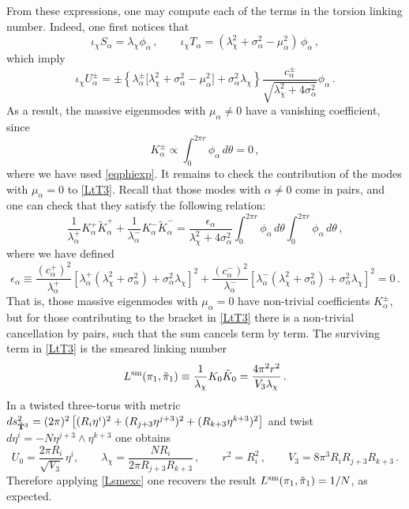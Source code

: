 \documentclass[11pt]{article}
\def\a {\alpha}
\def\be{\begin{equation}}
\def\ee{\end{equation}}
\def\th {{\theta}}
\begin{document}
From these expressions, one may compute each of the terms in the torsion linking number. Indeed, one first notices that
\begin{equation}
	\iota_\chi S_\a =   \lambda_\chi \phi_\a \,, \qquad \iota_\chi T_\a = ( \lambda_\chi^2 + \sigma_\a^2 -  \mu_\a^2) \, \phi_\a \,,
\end{equation}
which imply
\begin{equation}
	\iota_\chi U^\pm_\a = \pm \left\{\lambda^\pm_\a\bigg[ \lambda_\chi^2+\sigma_\a^2-\mu_\a^2\bigg]+\sigma_\a^2  \lambda_\chi\right\}\frac{c_\a^{\pm} }{\sqrt{ \lambda_\chi^2 + 4 \sigma_\a^2}} \phi_\a\,.
\end{equation}
As a result, the  massive eigenmodes with $\mu_\a \neq 0$ have a vanishing coefficient, since
\begin{equation}
	K^\pm_\a \propto \int_0^{2 \pi r}  \phi_\a \, d \th = 0  \,,
\end{equation}
where we have used \eqref{eqphiexp}. It remains to check the contribution of the modes with $\mu_\a = 0$ to \eqref{LtT3}. Recall that those modes with $\alpha\neq 0$ come in pairs, and one can check that they satisfy the following relation:
\begin{equation}
	\frac{1}{\lambda_\a^+} K^+_\a \tilde{K}^+_\a + \frac{1}{\lambda_\a^-} K^-_\a \tilde{K}^-_\a = \frac{\epsilon_\a}{ \lambda_\chi^2 + 4\sigma_\a^2} \int_0^{2 \pi r}  \phi_\a \, d\th \int_0^{2 \pi r}  \phi_\a \, d\th \,,
\end{equation}
where we have defined
\begin{equation}\label{eqdelta}
	\epsilon_\a \equiv \frac{(c_\a^{+})^2}{\lambda_\a^+} \left[\lambda_\a^+( \lambda_\chi^2+\sigma_\a^2) + \sigma_\a^2  \lambda_\chi\right]^2 + \frac{(c_\a^{-})^2}{\lambda^-_\a} \left[\lambda_\a^-( \lambda_\chi^2+\sigma_\a^2) + \sigma_\a^2  \lambda_\chi\right]^2 = 0 \,.
\end{equation}
That is, those massive eigenmodes with $\mu_\a =0$ have non-trivial coefficients $K_\a^\pm$, but for those contributing to the  bracket in \eqref{LtT3} there is a non-trivial cancellation by pairs, such that the sum cancels term by term. The surviving term in \eqref{LtT3} is the smeared linking number
\begin{equation}
	L^{\rm sm}(\pi_1,\tilde{\pi}_1) \equiv \frac{1}{ \lambda_\chi} K_0 \tilde{K}_0  =  \frac{4\pi^2r^2}{V_3  \lambda_\chi}\,.
 	\label{Lsmexc}
\end{equation}
In a twisted three-torus with metric $ds^2_{\tilde{\bf T}^3} = (2\pi)^2 \left[(R_i\eta^i)^2 + (R_{j+3}\eta^{j+3})^2 + (R_{k+3}\eta^{k+3})^2 \right]$ and twist $d\eta^i = - N \eta^{j+3} \wedge \eta^{k+3}$ one obtains 
\be
U_0 =\frac{2\pi R_i}{\sqrt{V_3}}\,\eta^i ,\qquad\lambda_\chi = \frac{NR_i}{2\pi R_{j+3}R_{k+3}}\, , \qquad r^2 = R_i^2\, , \qquad V_3 = 8\pi^3 R_iR_{j+3}R_{k+3} \, .\label{eq: U0T3}
\ee
Therefore applying \eqref{Lsmexc} one recovers the result $L^{\rm sm}(\pi_1,\tilde{\pi}_1) = 1/N$, as expected.
\end{document}
